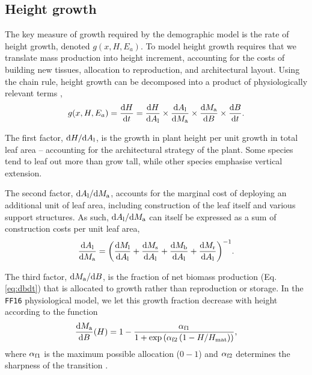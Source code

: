 \documentclass[10pt,twoside]{article}
\begin{document}
\subsection{Height growth}\label{height-growth-rate}

The key measure of growth required by the demographic model is the
rate of height growth, denoted $g(x, H, E_{a})$. To model height growth
requires that we translate mass
production into height increment, accounting for the costs of
building new tissues, allocation
to reproduction, and architectural layout. Using the chain rule, height growth
can be decomposed into a product of physiologically relevant terms
\citep{Falster-2011},
\begin{equation} \label{eq:dhdt}
g(x, H, E_{a}) = \frac{{\rm d}H}{{\rm d}t} = \frac{{\rm d}H}{{\rm d}A_{\rm l}}
\times \frac{{\rm d}A_{\rm l} }{{\rm d}M_{\rm a}}
\times \frac{{\rm d}M_{\rm a}}{{\rm d}B}
\times \frac{{\rm d}B}{{\rm d}t}.
\end{equation}

The first factor,
\({\rm d}H / {\rm d}A_{\rm l}\), is the growth in plant height
per unit growth in total leaf area -- accounting for the architectural
strategy of the plant. Some species tend to leaf out more than grow
tall, while other species emphasise vertical extension.

The second factor,
\({\rm d}A_{\rm l} / {\rm d}M_{\rm a}\), accounts for the
marginal cost of deploying an additional unit of leaf area, including
construction of the leaf itself and various support structures. As such,
\({\rm d}A_{\rm l} / {\rm d}M_{\rm a}\) can itself be
expressed as a sum of construction costs per unit leaf area,
\begin{equation}\label{eq:daldmt}
\frac{{\rm d}A_{\rm l}}{{\rm d}M_{\rm a}}
= \bigg( \frac{{\rm d}M_{\rm l}}{{\rm d}A_{\rm l}} + \frac{{\rm d}M_{\rm s}}{{\rm d}A_{\rm l}} + \frac{{\rm d}M_{\rm b}}{{\rm d}A_{\rm l}} + \frac{{\rm d}M_{\rm r}}{{\rm d}A_{\rm l}}\bigg)^{-1}.
\end{equation}

The third factor,
\({\rm d}M_{\rm a} / {\rm d}B\), is the fraction
of net biomass production (Eq. \ref{eq:dbdt}) that is allocated to
growth rather than reproduction or storage. In the \texttt{FF16} physiological model,
we let this growth fraction decrease with height according to the function
\begin{equation}\label{eq:allocation}
\frac{{\rm d}M_{\rm a}}{{\rm d}B}(H) = 1 -
\frac{\alpha_{{\rm f1}}} {1 + \exp\left(\alpha_{{\rm f2}} \left(1 - H / H_{\rm mat}\right)\right)},
\end{equation}
where $\alpha_{{\rm f1}}$ is the maximum possible allocation ($0-1$) and $\alpha_{{\rm f2}}$
determines the sharpness of the transition \citep{Falster-2011}.
\end{document}
